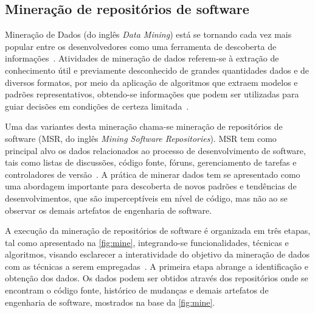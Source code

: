 \documentclass[oneside,brazil,a4paper]{normas-utf-tex}
\begin{document}
\subsection{Mineração de repositórios de software}

Mineração de Dados (do inglês \textit{Data Mining}) está se tornando cada vez mais popular entre os desenvolvedores como uma ferramenta de descoberta de informações~\cite{Cortes-etal:2002}. Atividades de mineração de dados referem-se à extração de conhecimento útil e previamente desconhecido de grandes quantidades dados e de diversos formatos, por meio da aplicação de algoritmos que extraem modelos e padrões representativos, obtendo-se informações que podem ser utilizadas para guiar decisões em condições de certeza limitada~\cite{Fayyad-etal:1996}.

Uma das variantes desta mineração chama-se mineração de repositórios de software (MSR, do inglês \textit{Mining Software Repositories}). MSR tem como principal alvo os dados relacionados ao processo de desenvolvimento de software, tais como listas de discussões, código fonte, fóruns, gerenciamento de tarefas e controladores de versão~\cite{Bird-etal:2006}. A prática de minerar dados tem se apresentado como uma abordagem importante para descoberta de novos padrões e tendências de desenvolvimentos, que são imperceptíveis em nível de código, mas não ao se observar os demais artefatos de engenharia de software.

A execução da mineração de repositórios de software é organizada em três etapas, tal como apresentado na \cref{fig:mine}, integrando-se funcionalidades, técnicas e algoritmos, visando esclarecer a interatividade do objetivo da mineração de dados com as técnicas a serem empregadas~\cite{Xie-etal:2009, Cortes-etal:2002}. A primeira etapa abrange a identificação e obtenção dos dados.  Os dados podem ser obtidos através dos repositórios onde se encontram o código fonte, histórico de mudanças e demais artefatos de engenharia de software, mostrados na base da \cref{fig:mine}.
\end{document}
